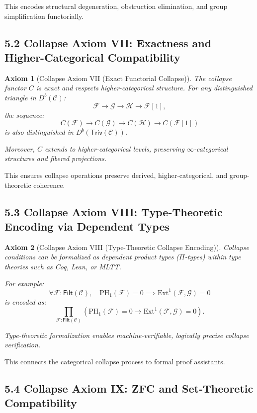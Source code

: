 \documentclass[11pt]{article}
\newtheorem{axiom}{Axiom}[section]
\begin{document}
This encodes structural degeneration, obstruction elimination, and group simplification functorially.

\subsection*{5.2 Collapse Axiom VII: Exactness and Higher-Categorical Compatibility}

\begin{axiom}[Collapse Axiom VII (Exact Functorial Collapse)]
The collapse functor \( C \) is exact and respects higher-categorical structure.  
For any distinguished triangle in \( D^b(\mathcal{C}) \):
\[
\mathcal{F} \to \mathcal{G} \to \mathcal{H} \to \mathcal{F}[1],
\]
the sequence:
\[
C(\mathcal{F}) \to C(\mathcal{G}) \to C(\mathcal{H}) \to C(\mathcal{F}[1])
\]
is also distinguished in \( D^b(\mathsf{Triv}(\mathcal{C})) \).

Moreover, \( C \) extends to higher-categorical levels, preserving \(\infty\)-categorical structures and fibered projections.
\end{axiom}

This ensures collapse operations preserve derived, higher-categorical, and group-theoretic coherence.

\subsection*{5.3 Collapse Axiom VIII: Type-Theoretic Encoding via Dependent Types}

\begin{axiom}[Collapse Axiom VIII (Type-Theoretic Collapse Encoding)]
Collapse conditions can be formalized as dependent product types (\(\Pi\)-types) within type theories such as Coq, Lean, or MLTT.

For example:
\[
\forall \mathcal{F} : \mathsf{Filt}(\mathcal{C}), \quad \mathrm{PH}_1(\mathcal{F}) = 0 \implies \mathrm{Ext}^1(\mathcal{F}, \mathcal{G}) = 0
\]
is encoded as:
\[
\prod_{\mathcal{F}:\mathsf{Filt}(\mathcal{C})} \left( \mathrm{PH}_1(\mathcal{F}) = 0 \rightarrow \mathrm{Ext}^1(\mathcal{F}, \mathcal{G}) = 0 \right).
\]

Type-theoretic formalization enables machine-verifiable, logically precise collapse verification.
\end{axiom}

This connects the categorical collapse process to formal proof assistants.

\subsection*{5.4 Collapse Axiom IX: ZFC and Set-Theoretic Compatibility}
\end{document}
